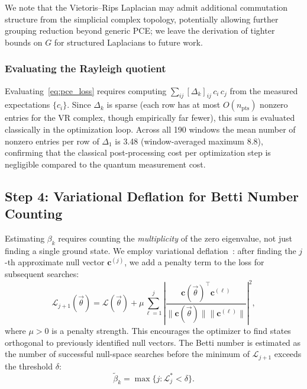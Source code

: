 \documentclass[conference,10pt]{IEEEtran}
\begin{document}
We note that the Vietoris--Rips Laplacian may admit additional
commutation structure from the simplicial complex topology,
potentially allowing further grouping reduction beyond generic PCE; we
leave the derivation of tighter bounds on $G$ for structured
Laplacians to future work.

\subsubsection{Evaluating the Rayleigh quotient}

Evaluating~\eqref{eq:pce_loss} requires computing
$\sum_{ij} [\Delta_k]_{ij}\, c_i\, c_j$ from the measured expectations
$\{c_i\}$. Since $\Delta_k$ is sparse (each row has at most
$O(n_{\mathrm{pts}})$ nonzero entries for the VR complex, though
empirically far fewer), this sum is evaluated classically in the
optimization loop. Across all 190 windows the mean number of nonzero
entries per row of $\Delta_1$ is 3.48 (window-averaged maximum 8.8),
confirming that the classical post-processing cost per optimization
step is negligible compared to the quantum measurement cost.

\subsection{Step 4: Variational Deflation for Betti Number Counting}
\label{sec:deflation}

Estimating $\beta_k$ requires counting the \emph{multiplicity} of the
zero eigenvalue, not just finding a single ground state. We employ
variational deflation~\cite{Higgott19}: after finding the $j$-th
approximate null vector $\mathbf{c}^{(j)}$, we add a penalty term to
the loss for subsequent searches:
\begin{equation}
    \mathcal{L}_{j+1}(\vec{\theta})
    = \mathcal{L}(\vec{\theta})
      + \mu \sum_{\ell=1}^{j}
        \left|
        \frac{\mathbf{c}(\vec{\theta})^\top
              \mathbf{c}^{(\ell)}}
             {\|\mathbf{c}(\vec{\theta})\|
              \|\mathbf{c}^{(\ell)}\|}
        \right|^2,
    \label{eq:deflation}
\end{equation}
where $\mu > 0$ is a penalty strength. This encourages the optimizer to
find states orthogonal to previously identified null vectors. The Betti
number is estimated as the number of successful null-space searches
before the minimum of $\mathcal{L}_{j+1}$ exceeds the threshold
$\delta$:
\begin{equation}
    \tilde{\beta}_k = \max\{j : \mathcal{L}_j^* < \delta\}.
    \label{eq:betti_pce}
\end{equation}
\end{document}
